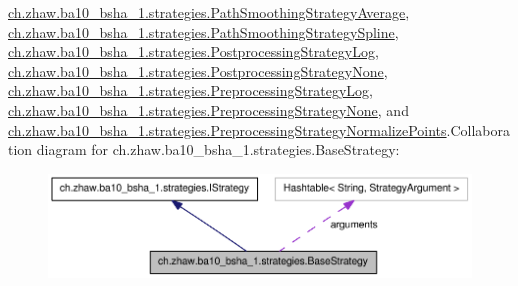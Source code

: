 \hyperlink{classch_1_1zhaw_1_1ba10__bsha__1_1_1strategies_1_1PathSmoothingStrategyAverage}{ch.zhaw.ba10\_\-bsha\_\-1.strategies.PathSmoothingStrategyAverage}, \hyperlink{classch_1_1zhaw_1_1ba10__bsha__1_1_1strategies_1_1PathSmoothingStrategySpline}{ch.zhaw.ba10\_\-bsha\_\-1.strategies.PathSmoothingStrategySpline}, \hyperlink{classch_1_1zhaw_1_1ba10__bsha__1_1_1strategies_1_1PostprocessingStrategyLog}{ch.zhaw.ba10\_\-bsha\_\-1.strategies.PostprocessingStrategyLog}, \hyperlink{classch_1_1zhaw_1_1ba10__bsha__1_1_1strategies_1_1PostprocessingStrategyNone}{ch.zhaw.ba10\_\-bsha\_\-1.strategies.PostprocessingStrategyNone}, \hyperlink{classch_1_1zhaw_1_1ba10__bsha__1_1_1strategies_1_1PreprocessingStrategyLog}{ch.zhaw.ba10\_\-bsha\_\-1.strategies.PreprocessingStrategyLog}, \hyperlink{classch_1_1zhaw_1_1ba10__bsha__1_1_1strategies_1_1PreprocessingStrategyNone}{ch.zhaw.ba10\_\-bsha\_\-1.strategies.PreprocessingStrategyNone}, and \hyperlink{classch_1_1zhaw_1_1ba10__bsha__1_1_1strategies_1_1PreprocessingStrategyNormalizePoints}{ch.zhaw.ba10\_\-bsha\_\-1.strategies.PreprocessingStrategyNormalizePoints}.Collaboration diagram for ch.zhaw.ba10\_\-bsha\_\-1.strategies.BaseStrategy:\nopagebreak
\begin{figure}[H]
\begin{center}
\leavevmode
\includegraphics[width=400pt]{classch_1_1zhaw_1_1ba10__bsha__1_1_1strategies_1_1BaseStrategy__coll__graph}
\end{center}
\end{figure}
